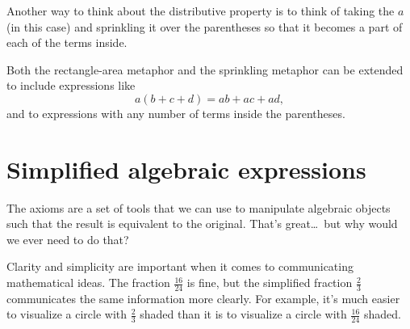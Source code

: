 \begin{center}
\end{center}
Another way to think about the distributive property is to think of taking the $a$ (in this case) and sprinkling it over the parentheses so that it becomes a part of each of the terms inside.
\begin{center}
\end{center}
Both the rectangle-area metaphor and the sprinkling metaphor can be extended to include expressions like \[a(b+c+d) = ab + ac + ad,\] and to expressions with any number of terms inside the parentheses.

\section{Simplified algebraic expressions}
\label{sec:simpalgexpr}

The axioms are a set of tools that we can use to manipulate algebraic objects such that the result is equivalent to the original. That's great\ldots\ but why would we ever need to do that?

Clarity and simplicity are important when it comes to communicating mathematical ideas. The fraction $\frac{16}{24}$ is fine, but the simplified fraction $\frac{2}{3}$ communicates the same information more clearly. For example, it's much easier to visualize a circle with $\frac{2}{3}$ shaded than it is to visualize a circle with $\frac{16}{24}$ shaded.

